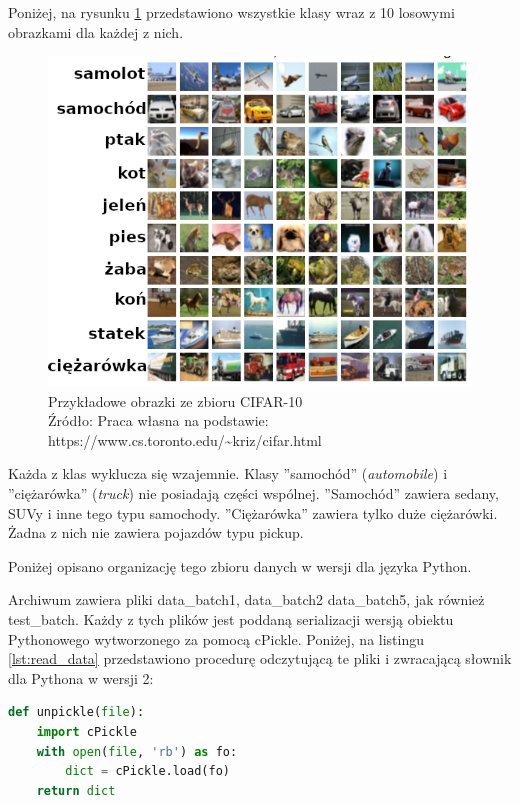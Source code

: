Poniżej, na rysunku \ref{fig:sample_data} przedstawiono wszystkie klasy wraz z 10 losowymi obrazkami dla każdej z nich.
\begin{figure}[h!tb]
	 \centering
	 \includegraphics[width = 1.0\linewidth]{img/sample_images}
	 \caption{Przykładowe obrazki ze zbioru CIFAR-10 \\
              Źródło: Praca własna na podstawie: https://www.cs.toronto.edu/\textasciitilde kriz/cifar.html}
	 \label{fig:sample_data}
\end{figure}

Każda z klas wyklucza się wzajemnie. Klasy ''samochód'' (\textit{automobile}) i ''ciężarówka'' (\textit{truck}) nie posiadają części wspólnej. ''Samochód'' zawiera sedany, SUVy i inne tego typu samochody. ''Ciężarówka'' zawiera tylko duże ciężarówki. Żadna z nich nie zawiera pojazdów typu pickup.

Poniżej opisano organizację tego zbioru danych w wersji dla języka Python.

Archiwum zawiera pliki data\_batch1, data\_batch2 data\_batch5, jak również test\_batch. Każdy z tych plików jest poddaną serializacji wersją obiektu Pythonowego wytworzonego za pomocą cPickle. Poniżej, na listingu \ref{lst:read_data} przedstawiono procedurę odczytującą te pliki i zwracającą słownik dla Pythona w wersji 2:

\begin{lstlisting}[caption={Procedura ładowania zbioru danych},label={lst:read_data},language=Python,captionpos=b,frame=single]
def unpickle(file):
    import cPickle
    with open(file, 'rb') as fo:
        dict = cPickle.load(fo)
    return dict
\end{lstlisting}

